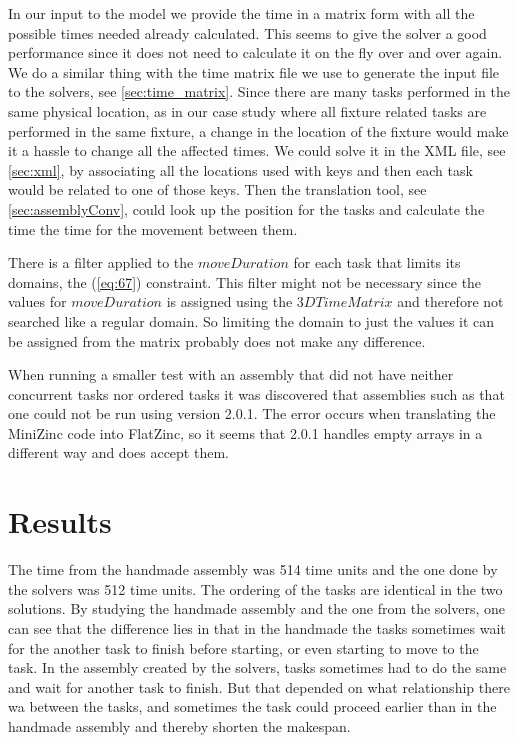 In our input to the model we provide the time in a matrix form with all the possible times needed already calculated. This seems to give the solver a good performance since it does not need to calculate it on the fly over and over again. We do a similar thing with the time matrix file we use to generate the input file to the solvers, see \ref{sec:time_matrix}. Since there are many tasks performed in the same physical location, as in our case study where all fixture related tasks are performed in the same fixture, a change in the location of the fixture would make it a hassle to change all the affected times. We could solve it in the XML file, see \ref{sec:xml}, by associating all the locations used with keys and then each task would be related to one of those keys. Then the translation tool, see \ref{sec:assemblyConv}, could look up the position for the tasks and calculate the time the time for the movement between them.

There is a filter applied to the $moveDuration$ for each task that limits its domains, the (\ref{eq:67}) constraint. This filter might not be necessary since the values for $moveDuration$ is assigned using the $3DTimeMatrix$ and therefore not searched like a regular domain. So limiting the domain to just the values it can be assigned from the matrix probably does not make any difference.

When running a smaller test with an assembly that did not have neither concurrent tasks nor ordered tasks it was discovered that assemblies such as that one could not be run using version 2.0.1. The error occurs when translating the MiniZinc code into FlatZinc, so it seems that 2.0.1 handles empty arrays in a different way and does accept them.

\section{Results}
The time from the handmade assembly was 514 time units and the one done by the solvers was 512 time units. The ordering of the tasks are identical in the two solutions. By studying the handmade assembly and the one from the solvers, one can see that the difference lies in that in the handmade the tasks sometimes wait for the another task to finish before starting, or even starting to move to the task. In the assembly created by the solvers, tasks sometimes had to do the same and wait for another task to finish. But that depended on what relationship there wa between the tasks, and sometimes the task could proceed earlier than in the handmade assembly and thereby shorten the makespan.

